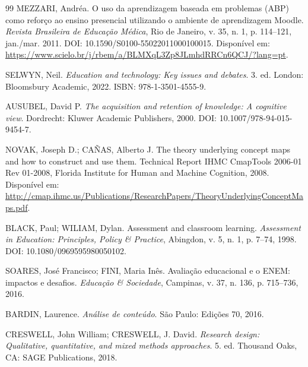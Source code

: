 \begin{thebibliography}{99}
MEZZARI, Andréa. O uso da aprendizagem baseada em problemas (ABP) como reforço ao ensino presencial utilizando o ambiente de aprendizagem Moodle. \textit{Revista Brasileira de Educação Médica}, Rio de Janeiro, v. 35, n. 1, p. 114--121, jan./mar. 2011. DOI: 10.1590/S0100-55022011000100015. Disponível em: \url{https://www.scielo.br/j/rbem/a/BLMXqL3Zp8JLmhdRRCn6QCJ/?lang=pt}.

SELWYN, Neil. \textit{Education and technology: Key issues and debates}. 3. ed. London: Bloomsbury Academic, 2022. ISBN: 978-1-3501-4555-9.


AUSUBEL, David P. \textit{The acquisition and retention of knowledge: A cognitive view}. Dordrecht: Kluwer Academic Publishers, 2000. DOI: 10.1007/978-94-015-9454-7.

NOVAK, Joseph D.; CAÑAS, Alberto J. The theory underlying concept maps and how to construct and use them. Technical Report IHMC CmapTools 2006-01 Rev 01-2008, Florida Institute for Human and Machine Cognition, 2008. Disponível em: \url{http://cmap.ihmc.us/Publications/ResearchPapers/TheoryUnderlyingConceptMaps.pdf}.


BLACK, Paul; WILIAM, Dylan. Assessment and classroom learning. \textit{Assessment in Education: Principles, Policy \& Practice}, Abingdon, v. 5, n. 1, p. 7--74, 1998. DOI: 10.1080/0969595980050102.

SOARES, José Francisco; FINI, Maria Inês. Avaliação educacional e o ENEM: impactos e desafios. \textit{Educação \& Sociedade}, Campinas, v. 37, n. 136, p. 715--736, 2016.


BARDIN, Laurence. \textit{Análise de conteúdo}. São Paulo: Edições 70, 2016.

CRESWELL, John William; CRESWELL, J. David. \textit{Research design: Qualitative, quantitative, and mixed methods approaches}. 5. ed. Thousand Oaks, CA: SAGE Publications, 2018.


\end{thebibliography}
